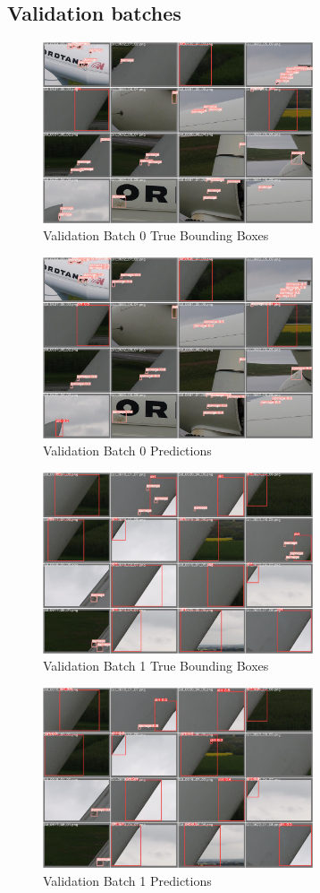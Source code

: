 \documentclass[conference]{IEEEtran}
\begin{document}
\subsection{Validation batches}
\begin{figure}[H]
    \centering
    \includegraphics[width=8cm]{Images/YOLOv5s/val_batch0_labels.jpg}
    \caption{Validation Batch 0 True Bounding Boxes}
\end{figure}
\begin{figure}[H]
    \centering
    \includegraphics[width=8cm]{Images/YOLOv5s/val_batch0_pred.jpg}
    \caption{Validation Batch 0 Predictions}
\end{figure}
\begin{figure}[H]
    \centering
    \includegraphics[width=8cm]{Images/YOLOv5s/val_batch1_labels.jpg}
    \caption{Validation Batch 1 True Bounding Boxes}
\end{figure}
\begin{figure}[H]
    \centering
    \includegraphics[width=8cm]{Images/YOLOv5s/val_batch1_pred.jpg}
    \caption{Validation Batch 1 Predictions}
\end{figure}
\end{document}
